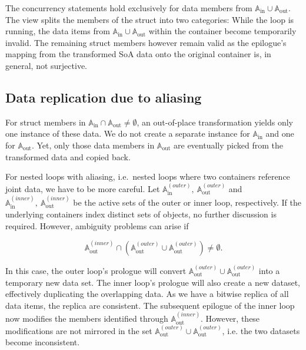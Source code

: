 The concurrency statements hold exclusively for data members from $\mathbb{A}_{\text{in}} \cup \mathbb{A}_{\text{out}}$.
The view splits the members of the struct into two categories:
While the loop is running, the data items from $\mathbb{A}_{\text{in}} \cup \mathbb{A}_{\text{out}}$ within the container become temporarily invalid.
The remaining struct members however remain valid as the epilogue's mapping from the transformed SoA data onto the original container is, in general, not surjective.


\subsection{Data replication due to aliasing}

For struct members in $\mathbb{A}_{\text{in}} \cap \mathbb{A}_{\text{out}} \not= \emptyset$, an out-of-place transformation yields only one instance of these data.
We do not create a separate instance for $\mathbb{A}_{\text{in}}$ and one for $\mathbb{A}_{\text{out}}$.
Yet, only those data members in $\mathbb{A}_{\text{out}}$ are eventually picked from the transformed data and copied back.


For nested loops with aliasing, i.e.~nested loops where two containers reference joint data, we have to be more careful.
Let $\mathbb{A}_{\text{in}}^{(outer)},\ \mathbb{A}_{\text{out}}^{(outer)}$ and $\mathbb{A}_{\text{in}}^{(inner)},\ \mathbb{A}_{\text{out}}^{(inner)}$ be the active sets of the outer or inner loop, respectively.
If the underlying containers index distinct sets of objects, no further discussion is required.
However, ambiguity problems can arise if 

\[
\mathbb{A}_{\text{out}}^{(inner)} \cap \left( \mathbb{A}_{\text{out}}^{(outer)} \cup \mathbb{A}_{\text{out}}^{(outer)} \right) \not= \emptyset.
\]


\noindent
In this case, the outer loop's prologue will convert $\mathbb{A}_{\text{out}}^{(outer)} \cup \mathbb{A}_{\text{out}}^{(outer)}$ into a temporary new data set.
The inner loop's prologue will also create a new dataset, effectively duplicating the overlapping data.
As we have a bitwise replica of all data items, the replica are consistent.
The subsequent epilogue of the inner loop now modifies the members identified through $\mathbb{A}_{\text{out}}^{(inner)}$.
However, these modifications are not mirrored in the set $\mathbb{A}_{\text{out}}^{(outer)} \cup \mathbb{A}_{\text{out}}^{(outer)}$, i.e. the two datasets become inconsistent.


